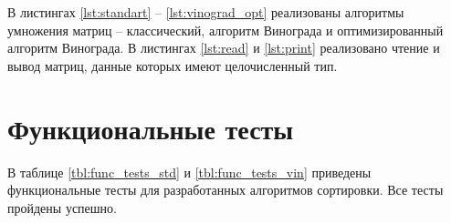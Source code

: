 В листингах \ref{lst:standart} -- \ref{lst:vinograd_opt} реализованы алгоритмы умножения матриц -- классический, алгоритм Винограда и оптимизированный алгоритм Винограда.
В листингах \ref{lst:read} и \ref{lst:print} реализовано чтение и вывод матриц, данные которых имеют целочисленный тип.

\clearpage


\clearpage


\clearpage


\clearpage



\clearpage



\clearpage

\section{Функциональные тесты}

В таблице \ref{tbl:func_tests_std} и \ref{tbl:func_tests_vin} приведены функциональные тесты для разработанных алгоритмов сортировки. Все тесты пройдены успешно.

